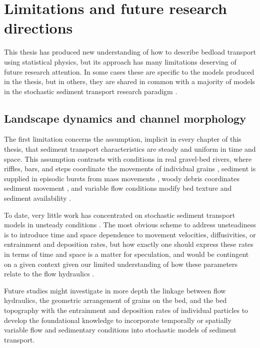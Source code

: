 \section{Limitations and future research directions}

This thesis has produced new understanding of how to describe bedload transport using statistical physics, but its approach has many limitations deserving of future research attention.
In some cases these are specific to the models produced in the thesis, but in others, they are shared in common with a majority of models in the stochastic sediment transport research paradigm \citep{Ancey2020,Furbish2021a}.

\subsection{Landscape dynamics and channel morphology}

The first limitation concerns the assumption, implicit in every chapter of this thesis, that sediment transport characteristics are steady and uniform in time and space.
This assumption contrasts with conditions in real gravel-bed rivers, where riffles, bars, and steps coordinate the movements of individual grains \citep{Ashmore1998,McDowell2020}, sediment is supplied in episodic bursts from mass movements \citep{Benda1990, Muller2018}, woody debris coordinates sediment movement \citep{Eaton2012,Reid2019}, and variable flow conditions modify bed texture and sediment availability \citep{Mao2012,Phillips2018}.

To date, very little work has concentrated on stochastic sediment transport models in unsteady conditions \citep[e.g.][]{Bohorquez2016}.
The most obvious scheme to address unsteadiness is to introduce time and space dependence to movement velocities, diffusivities, or entrainment and deposition rates, but how exactly one should express these rates in terms of time and space is a matter for speculation, and would be contingent on a given context given our limited understanding of how these parameters relate to the flow hydraulics \citep[e.g.][]{Heyman2016}.

Future studies might investigate in more depth the linkage between flow hydraulics, the geometric arrangement of grains on the bed, and the bed topography with the entrainment and deposition rates of individual particles to develop the foundational knowledge to incorporate temporally or spatially variable flow and sedimentary conditions into stochastic models of sediment transport.

